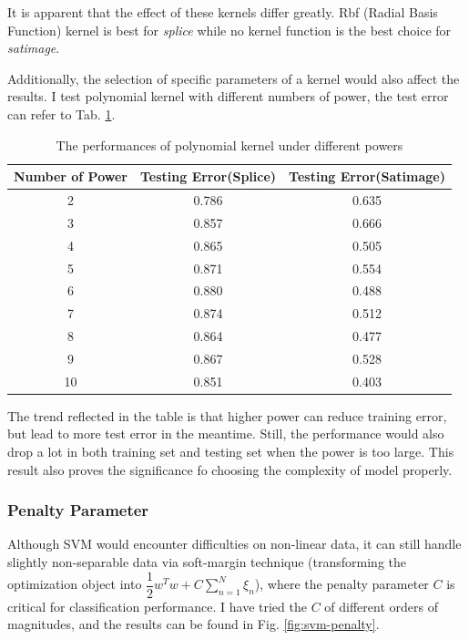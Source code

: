 \documentclass[12pt,a4paper]{article}
\theoremstyle{definition}
\begin{document}
It is apparent that the effect of these kernels differ greatly. Rbf (Radial Basis Function) kernel is best for \textit{splice} while no kernel function is the best choice for \textit{satimage}. 

\vspace{0.01\linewidth}
Additionally, the selection of specific parameters of a kernel would also affect the results. I test polynomial kernel with different numbers of power, the test error can refer to Tab. \ref{tab:kernel-poly}.

\begin{table}[H]
	\renewcommand\arraystretch{1.35}
	\caption{The performances of polynomial kernel under different powers}
	\label{tab:kernel-poly}
	\centering
	
	\begin{tabular}{c|c|c}
		\centering
		Number of Power & Testing Error(Splice) & Testing Error(Satimage) \\
		\hline
		
		2 & 0.786 & 0.635 \\
		3 & 0.857 & 0.666 \\
		4 & 0.865 & 0.505 \\
		5 & 0.871 & 0.554 \\
		6 & 0.880 & 0.488 \\
		7 & 0.874 & 0.512 \\
		8 & 0.864 & 0.477 \\
		9 & 0.867 & 0.528 \\
		10 & 0.851 & 0.403 \\
	\end{tabular}
\end{table}

The trend reflected in the table is that higher power can reduce training error, but lead to more test error in the meantime. Still, the performance would also drop a lot in both training set and testing set when the power is too large. This result also proves the significance fo choosing the complexity of model properly.

\subsubsection{Penalty Parameter}

Although SVM would encounter difficulties on non-linear data, it can still handle slightly non-separable data via soft-margin technique (transforming the optimization object into $\dfrac{1}{2}w^Tw+C\sum\limits_{n=1}^{N}\xi_n$), where the penalty parameter $C$ is critical for classification performance. I have tried the $C$ of different orders of magnitudes, and the results can be found in Fig. \ref{fig:svm-penalty}.
\end{document}
